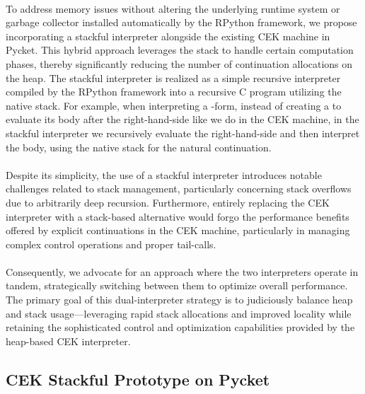     \paragraph{}%
      To address memory issues without altering the underlying runtime system or garbage collector installed automatically by the RPython framework, we propose incorporating a stackful interpreter alongside the existing CEK machine in Pycket. This hybrid approach leverages the stack to handle certain computation phases, thereby significantly reducing the number of continuation allocations on the heap. The stackful interpreter is realized as a simple recursive interpreter compiled by the RPython framework into a recursive C program utilizing the native stack. For example, when interpreting a -form, instead of creating a  to evaluate its body after the right-hand-side like we do in the CEK machine, in the stackful interpreter we recursively evaluate the right-hand-side and then interpret the body, using the native stack for the natural continuation.

    \paragraph{}%
      Despite its simplicity, the use of a stackful interpreter introduces notable challenges related to stack management, particularly concerning stack overflows due to arbitrarily deep recursion. Furthermore, entirely replacing the CEK interpreter with a stack-based alternative would forgo the performance benefits offered by explicit continuations in the CEK machine, particularly in managing complex control operations and proper tail-calls.

    \paragraph{}%
      Consequently, we advocate for an approach where the two interpreters operate in tandem, strategically switching between them to optimize overall performance. The primary goal of this dual-interpreter strategy is to judiciously balance heap and stack usage—leveraging rapid stack allocations and improved locality while retaining the sophisticated control and optimization capabilities provided by the heap-based CEK interpreter.

    \subsection{CEK \+ Stackful Prototype on Pycket}

